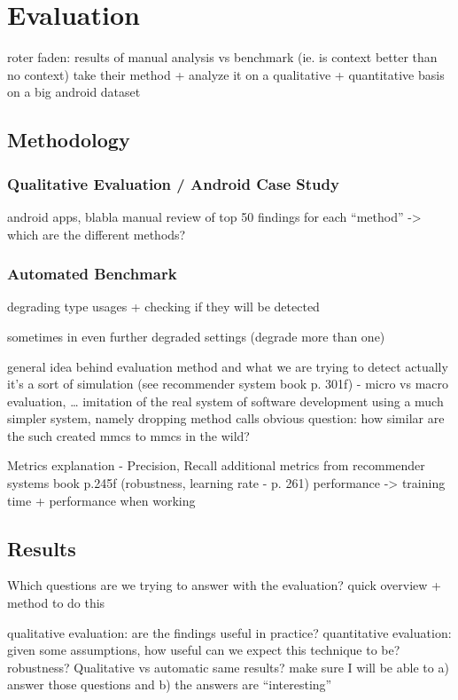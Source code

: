 \chapter{Evaluation}\label{ch:eval}
roter faden: results of manual analysis vs benchmark (ie. is context better than no context)
take their method + analyze it on a qualitative + quantitative basis on a big android dataset


\section{Methodology}

\subsection{Qualitative Evaluation / Android Case Study}
android apps, blabla
manual review of top 50 findings for each ``method''
-> which are the different methods?

\subsection{Automated Benchmark}
degrading type usages + checking if they will be detected

sometimes in even further degraded settings (degrade more than one)

general idea behind evaluation method and what we are trying to detect
actually it's a sort of simulation (see recommender system book p. 301f) - micro vs macro evaluation, \ldots
    imitation of the real system of software development
    using a much simpler system, namely dropping method calls
    obvious question: how similar are the such created mmcs to mmcs in the wild?

Metrics explanation - Precision, Recall
    additional metrics from recommender systems book p.245f (robustness, learning rate - p. 261)
    performance -> training time + performance when working

\section{Results}
Which questions are we trying to answer with the evaluation?
quick overview + method to do this

qualitative evaluation: are the findings useful in practice?
quantitative evaluation: given some assumptions, how useful can we expect this technique to be? robustness? Qualitative vs automatic same results?
make sure I will be able to a) answer those questions and b) the answers are ``interesting''

